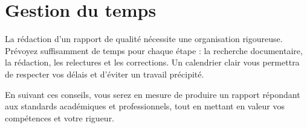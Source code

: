 \section{Gestion du temps}

La rédaction d'un rapport de qualité nécessite une organisation rigoureuse. Prévoyez suffisamment de temps pour chaque étape : la recherche documentaire, la rédaction, les relectures et les corrections. Un calendrier clair vous permettra de respecter vos délais et d'éviter un travail précipité.

En suivant ces conseils, vous serez en mesure de produire un rapport répondant aux standards académiques et professionnels, tout en mettant en valeur vos compétences et votre rigueur.